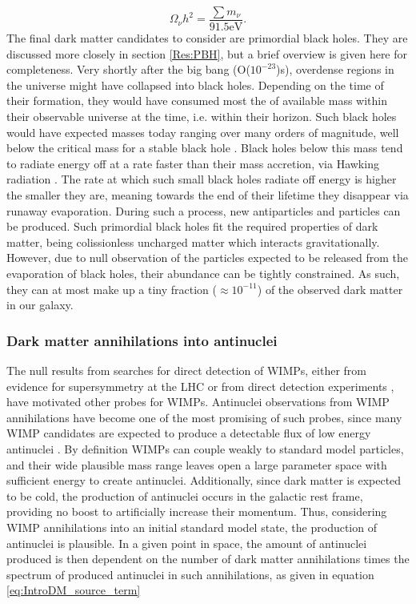\begin{equation}\label{eq:NeutrinoAbundance}
    \Omega_\nu h^2 = \frac{\sum m_\nu}{91.5 \mathrm{eV}}.
\end{equation}
The final dark matter candidates to consider are primordial black holes. They are discussed more closely in section \ref{Res:PBH}, but a brief overview is given here for completeness. Very shortly after the big bang (O($10^{-23}$)s), overdense regions in the universe might have collapsed into black holes. Depending on the time of their formation, they would have consumed most the of available mass within their observable universe at the time, i.e. within their horizon. Such black holes would have expected masses today ranging over many orders of magnitude, well below the critical mass for a stable black hole \cite{HAWKING1974}. Black holes below this mass tend to radiate energy off at a rate faster than their mass accretion, via Hawking radiation \cite{VISSER_2003, HAWKING1974}. The rate at which such small black holes radiate off energy is higher the smaller they are, meaning towards the end of their lifetime they disappear via runaway evaporation. During such a process, new antiparticles and particles can be produced. Such primordial black holes fit the required properties of dark matter, being colissionless uncharged matter which interacts gravitationally. However, due to null observation of the particles expected to be released from the evaporation of black holes, their abundance can be tightly constrained. As such, they can at most make up a tiny fraction ($\approx 10^{-11}$) of the observed dark matter in our galaxy.

\subsubsection{Dark matter annihilations into antinuclei}
The null results from searches for direct detection of WIMPs, either from evidence for supersymmetry at the LHC or from direct detection experiments \cite{XENON2, Lux}, have motivated other probes for WIMPs. Antinuclei observations from WIMP annihilations have become one of the most promising of such probes, since many WIMP candidates are expected to produce a detectable flux of low energy antinuclei \cite{Ibarra:2012cc, Korsmeier:2017xzj}. By definition WIMPs can couple weakly to standard model particles, and their wide plausible mass range leaves open a large parameter space with sufficient energy to create antinuclei. Additionally, since dark matter is expected to be cold, the production of antinuclei occurs in the galactic rest frame, providing no boost to artificially increase their momentum. Thus, considering WIMP annihilations into an initial standard model state, the production of antinuclei is plausible. In a given point in space, the amount of antinuclei produced is then dependent on the number of dark matter annihilations times the spectrum of produced antinuclei in such annihilations, as given in equation \ref{eq:IntroDM_source_term}

